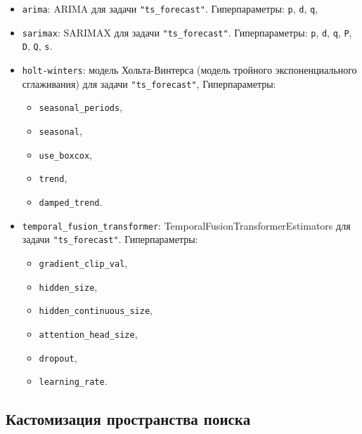 \documentclass[%
	11pt,
	a4paper,
	utf8,
		]{article}
\begin{document}
\begin{itemize}
    \item \verb|arima|: ARIMA для задачи \verb|"ts_forecast"|. Гиперпараметры: \verb|p|, \verb|d|, \verb|q|,
    
    \item \verb|sarimax|: SARIMAX для задачи \verb|"ts_forecast"|. Гиперпараметры: \verb|p|, \verb|d|, \verb|q|, \verb|P|, \verb|D|, \verb|Q|, \verb|s|.
    
    \item \verb|holt-winters|: модель Хольта-Винтерса (модель тройного экспоненциального сглаживания) для задачи \verb|"ts_forecast"|, Гиперпараметры:
    \begin{itemize}
    	\item \verb|seasonal_periods|,
    	
    	\item \verb|seasonal|,
    	
    	\item \verb|use_boxcox|,
    	
    	\item \verb|trend|,
    	
    	\item \verb|damped_trend|.
    \end{itemize}

    \item \verb|temporal_fusion_transformer|: TemporalFusionTransformerEstimators для задачи  \verb|"ts_forecast"|. Гиперпараметры:
    \begin{itemize}
    	\item \verb|gradient_clip_val|,
    	
    	\item \verb|hidden_size|,
    	
    	\item \verb|hidden_continuous_size|,
    	
    	\item \verb|attention_head_size|,
    	
    	\item \verb|dropout|,
    	
    	\item \verb|learning_rate|.
    \end{itemize}
\end{itemize}

\subsection{Кастомизация пространства поиска}
\end{document}
